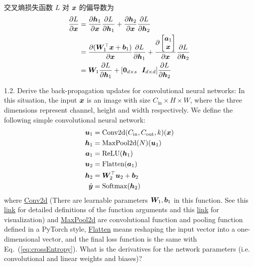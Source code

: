 \documentclass{article}
\begin{document}
交叉熵损失函数 $L$ 对 $\bm{x}$ 的偏导数为
\begin{equation}
  \begin{aligned}
    \frac{\partial L}{\partial \bm{x}}
    &=\frac{\partial \bm{h}_1}{\partial \bm{x}}\frac{\partial L}{\partial \bm{h}_1}+\frac{\partial \bm{h}_2}{\partial \bm{x}}\frac{\partial L}{\partial \bm{h}_2}\\
    &=\frac{\partial (\bm{W}_1^\top\bm{x}+\bm{b}_1)}{\partial \bm{x}}\frac{\partial L}{\partial \bm{h}_1}+\frac{\partial \begin{bmatrix}
      \bm{a}_1\\\bm{x}\\
    \end{bmatrix}}{\partial \bm{x}}\frac{\partial L}{\partial \bm{h}_2}\\
    &=\bm{W}_1\frac{\partial L}{\partial \bm{h}_1}+[\bm{0}_{d\times s}~~\bm{I}_{d\times d}]\frac{\partial L}{\partial \bm{h}_2}\\
  \end{aligned}
\end{equation}

1.2. Derive the back-propagation updates for convolutional neural networks: In this situation, the input $\bm{x}$ is an image with size $C_{\mathrm{in}} \times H \times W$, where the three dimensions represent channel, height and width respectively. We define the following simple convolutional neural network:
\begin{align}
  \bm{u}_1 &= \mathrm{Conv2d}(C_{\mathrm{in}}, C_{\mathrm{out}}, k)(\bm{x}) \\
  \bm{h}_1 &= \mathrm{MaxPool2d}(N)(\bm{u}_1) \\
  \bm{a}_1 &= \mathrm{ReLU}(\bm{h}_1) \\
  \bm{u}_2 &= \mathrm{Flatten}(\bm{a}_1) \\
  \bm{h}_2 &= \bm{W}_2^\top\bm{u}_2 + \bm{b}_2\\
  \hat{\bm{y}} &= \mathrm{Softmax}(\bm{h}_2)
\end{align}
where \href{https://pytorch.org/docs/stable/generated/torch.nn.Conv2d.html}{Conv2d} (There are learnable parameters $\bm{W}_1, \bm{b}_1$ in this function. See this \href{https://pytorch.org/docs/stable/generated/torch.nn.Conv2d.html}{link} for detailed definitions of the function arguments and this \href{https://github.com/vdumoulin/conv_arithmetic/blob/master/README.md}{link} for visualization) and \href{https://pytorch.org/docs/stable/generated/torch.nn.MaxPool2d.html}{MaxPool2d} are convolutional function and pooling function defined in a PyTorch style, \href{https://pytorch.org/docs/stable/generated/torch.flatten.html}{Flatten} means reshaping the input vector into a one-dimensional vector, and the final loss function is the same with Eq.~(\ref{eq:crossEntropy}). What is the derivatives for the network parameters (i.e. convolutional and linear weights and biases)?
\end{document}
